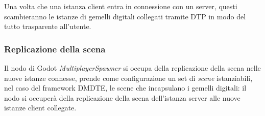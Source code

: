 Una volta che una istanza client entra in connessione con un server, questi scambieranno le istanze di gemelli digitali collegati tramite DTP in modo del tutto trasparente all'utente.

\subsubsection*{Replicazione della scena}
Il nodo di Godot \textit{MultiplayerSpawner} si occupa della replicazione della scena nelle nuove istanze connesse, prende come configurazione un set di \textit{scene} istanziabili, nel caso del framework DMDTE, le scene che incapsulano i gemelli digitali: il nodo si occuperà della replicazione della scena dell'istanza server alle nuove istanze client collegate.